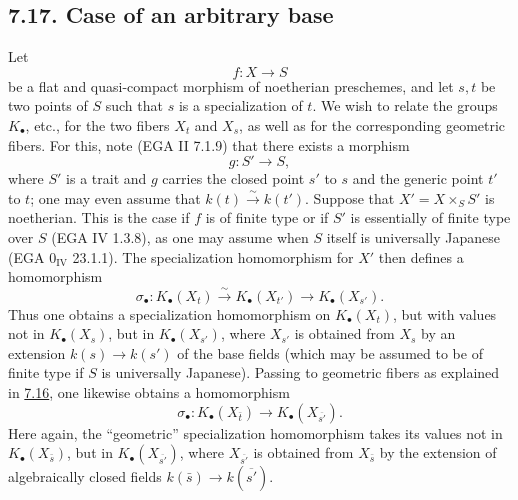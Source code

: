 \subsection*{7.17. Case of an arbitrary base}
Let
\[
f:X\longrightarrow S
\]
be a flat and quasi-compact morphism of noetherian preschemes, and let $s,t$
be two points of $S$ such that $s$ is a specialization of $t$. We wish to
relate the groups $K_\bullet$, etc., for the two fibers $X_t$ and $X_s$, as
well as for the corresponding geometric fibers. For this, note (EGA II
7.1.9) that there exists a morphism
\[
g:S'\longrightarrow S,
\]
where $S'$ is a trait and $g$ carries the closed point $s'$ to $s$ and the
generic point $t'$ to $t$; one may even assume that
$k(t)\xrightarrow{\sim}k(t')$. Suppose that $X'=X\times_SS'$ is
noetherian. This is the case if $f$ is of finite type or if $S'$ is
essentially of finite type over $S$ (EGA IV 1.3.8), as one may assume when
$S$ itself is universally Japanese (EGA $0_{\mathrm{IV}}$ 23.1.1). The
specialization homomorphism for $X'$ then defines a homomorphism
\begin{equation}\tag{7.17.1}
\sigma_\bullet:K_\bullet(X_t)\xrightarrow{\sim}K_\bullet(X_{t'})
  \longrightarrow K_\bullet(X_{s'}).
\end{equation}
Thus one obtains a specialization homomorphism on $K_\bullet(X_t)$, but with
values not in $K_\bullet(X_s)$, but in $K_\bullet(X_{s'})$, where $X_{s'}$
is obtained from $X_s$ by an extension $k(s)\to k(s')$ of the base fields
(which may be assumed to be of finite type if $S$ is universally Japanese).
Passing to geometric fibers as explained in \hyperlink{sga6.e10.sec.7.16}{7.16}, one likewise obtains a
homomorphism
\begin{equation}\tag{7.17.2}
\sigma_\bullet:K_\bullet(X_{\bar t})
  \longrightarrow K_\bullet(X_{\overline{s'}}).
\end{equation}
Here again, the ``geometric'' specialization homomorphism takes its values
not in $K_\bullet(X_{\bar s})$, but in
$K_\bullet(X_{\overline{s'}})$, where $X_{\overline{s'}}$ is obtained from
$X_{\bar s}$ by the extension of algebraically closed fields
$k(\bar s)\to k(\overline{s'})$.

